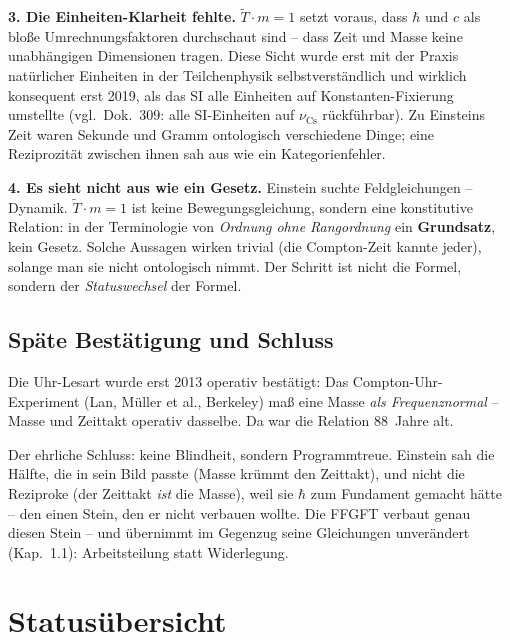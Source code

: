 \documentclass[11pt]{report}
\begin{document}
\textbf{3. Die Einheiten-Klarheit fehlte.} $\tilde T \cdot m = 1$
setzt voraus, dass $\hbar$ und $c$ als bloße Umrechnungsfaktoren
durchschaut sind -- dass Zeit und Masse keine unabhängigen
Dimensionen tragen. Diese Sicht wurde erst mit der Praxis
natürlicher Einheiten in der Teilchenphysik selbstverständlich und
wirklich konsequent erst 2019, als das SI alle Einheiten auf
Konstanten-Fixierung umstellte (vgl.\ Dok.~309: alle SI-Einheiten
auf $\nu_\text{Cs}$ rückführbar). Zu Einsteins Zeit waren Sekunde
und Gramm ontologisch verschiedene Dinge; eine Reziprozität
zwischen ihnen sah aus wie ein Kategorienfehler.

\textbf{4. Es sieht nicht aus wie ein Gesetz.} Einstein suchte
Feldgleichungen -- Dynamik. $\tilde T \cdot m = 1$ ist keine
Bewegungsgleichung, sondern eine konstitutive Relation: in der
Terminologie von \emph{Ordnung ohne Rangordnung} ein
\textbf{Grundsatz}, kein Gesetz. Solche Aussagen wirken trivial
(die Compton-Zeit kannte jeder), solange man sie nicht ontologisch
nimmt. Der Schritt ist nicht die Formel, sondern der
\emph{Statuswechsel} der Formel.

\section{Späte Bestätigung und Schluss}

Die Uhr-Lesart wurde erst 2013 operativ bestätigt: Das
Compton-Uhr-Experiment (Lan, Müller et al., Berkeley) maß eine
Masse \emph{als Frequenznormal} -- Masse und Zeittakt operativ
dasselbe. Da war die Relation 88~Jahre alt.

Der ehrliche Schluss: keine Blindheit, sondern Programmtreue.
Einstein sah die Hälfte, die in sein Bild passte (Masse krümmt den
Zeittakt), und nicht die Reziproke (der Zeittakt \emph{ist} die
Masse), weil sie $\hbar$ zum Fundament gemacht hätte -- den einen
Stein, den er nicht verbauen wollte. Die FFGFT verbaut genau diesen
Stein -- und übernimmt im Gegenzug seine Gleichungen unverändert
(Kap.~1.1): Arbeitsteilung statt Widerlegung.

\chapter{Statusübersicht}
\end{document}
